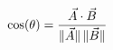 \documentclass[preview]{standalone}
\begin{document}
\begin{align*}
\special{dvisvgm:raw <g id='unique000'>}\cos(\theta) = \frac{\vec{A} \cdot \vec{B}}{\|\vec{A}\|\,\|\vec{B}\|}\special{dvisvgm:raw </g>}
\end{align*}
\end{document}
